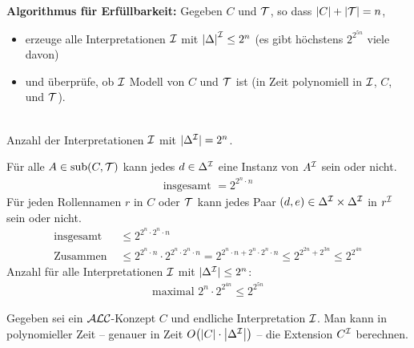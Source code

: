 \textbf{Algorithmus für Erfüllbarkeit:}
Gegeben $C$ und $\mathcal{T}$, so dass $|C|+|\mathcal{T}| = n$,
\begin{itemize} 
  \item erzeuge alle Interpretationen $\mathcal{I}$ mit $\left| \Delta \right|^\MI \leq 2^{n}$ (es gibt höchstens $2^{2^{5n}}$ viele davon) 
  \item und überprüfe, ob $\mathcal{I}$ Modell von $C$ und $\mathcal{T}$ ist (in Zeit polynomiell in $\mathcal{I}$, $C$, und $\mathcal{T}$).
\end{itemize}

\begin{tafel}\mbox{}\\
    Anzahl der Interpretationen $\mathcal{I}$ mit $|\Delta^{\mathcal{I}}| = 2^n$.
    
    Für alle $A \in \operatorname{sub}(C, \mathcal{T})$ kann jedes $d \in \Delta^{\mathcal{I}}$ eine Instanz von $A^{\mathcal{I}}$ sein oder nicht.
    \begin{align*}
        \text{insgesamt } = 2^{2^{n} \cdot n}
    \end{align*}
    Für jeden Rollennamen $r$ in $C$ oder $\mathcal{T}$ kann jedes Paar $(d, e) \in \Delta^{\mathcal{I}} \times \Delta^{\mathcal{I}}$ in $r^{\mathcal{I}}$ sein oder nicht.
    \begin{align*}
        \text{insgesamt } &\leq 2^{2^n \cdot 2^n \cdot n}\\
        \text{Zusammen } &\leq 2^{2^n \cdot n} \cdot 2^{2^n \cdot 2^n \cdot n} = 2^{2^n \cdot n + 2^n \cdot 2^n \cdot n} \leq 2^{2^{2n} + 2^{3n}} \leq 2^{2^{4n}}
    \end{align*}
    Anzahl für alle Interpretationen $\mathcal{I}$ mit $|\Delta^{\mathcal{I}}| \leq 2^n$:
    \begin{align*}
        \text{maximal } 2^n \cdot 2^{2^{4n}} \leq 2^{2^{5n}}
    \end{align*}
\end{tafel}

\begin{lemma}
    \label{lem:extensionsberechnung}
Gegeben sei ein $\mathcal{A}\mathcal{L}\mathcal{C}$-Konzept $C$ und endliche Interpretation $\mathcal{I}$. Man kann in polynomieller Zeit -- genauer in Zeit $O\left( \left| C \right| \cdot \left| \Delta^\MI \right| \right)$ -- die Extension $C^{\mathcal{I}}$ berechnen.
\end{lemma}

